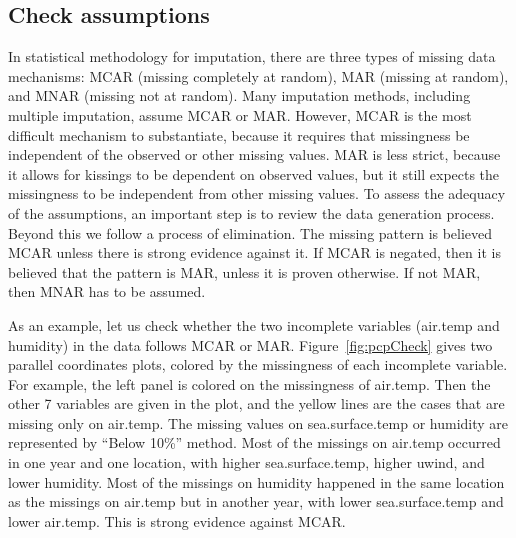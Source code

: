 \documentclass[article]{jss}
\begin{document}
\subsection{Check assumptions}

In statistical methodology for imputation, there are three types of missing data mechanisms: MCAR (missing completely at random), MAR (missing at random), and MNAR (missing not at random). Many imputation methods, including multiple imputation, assume MCAR or MAR. However, MCAR is the most difficult mechanism to substantiate, because it requires that missingness be independent of the observed or other missing values. MAR is less strict, because it allows for kissings to be dependent on observed values, but it still expects the missingness to be independent from other missing values. To assess the adequacy of the assumptions, an important step is to review the data generation process. Beyond this we follow a process of elimination. The missing pattern is believed MCAR unless there is strong evidence against it. If MCAR is negated, then it is believed that the pattern is MAR, unless it is proven otherwise. If not MAR, then MNAR has to be assumed.

As an example, let us check whether the two incomplete variables (air.temp and humidity) in the data  follows MCAR or MAR. Figure~\ref{fig:pcpCheck} gives two parallel coordinates plots, colored by the missingness of each incomplete variable. For example, the left panel is colored on the missingness of air.temp. Then the other 7 variables are given in the plot, and the yellow lines are the cases that are missing only on air.temp. The missing values on sea.surface.temp or humidity are represented by ``Below 10\%'' method. Most of the missings on air.temp occurred in one year and one location, with higher sea.surface.temp, higher uwind, and lower humidity. Most of the missings on humidity happened in the same location as the missings on air.temp but in another year, with lower sea.surface.temp and lower air.temp. This is strong evidence against MCAR.
\end{document}
